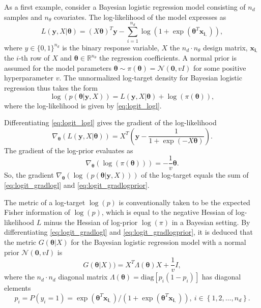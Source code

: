 \documentclass[twoside,11pt]{article}
\begin{document}
As a first example, consider a Bayesian logistic regression model consisting of $n_d$ samples and $n_{\theta}$ covariates. 
The log-likelihood of the model expresses as
\begin{equation}
\label{eq:logit_logl}
L(\mathbf{y}, X | \boldsymbol{\theta})=
(X\boldsymbol{\theta})^T\mathbf{y}-
\sum_{i=1}^{n_d}\log\left(1+\exp(\boldsymbol{\theta}^T
\mathbf{x_{i,}})\right),
\end{equation}
where $y\in\{0,1\}^{n_d}$ is the binary response variable, $X$ the $n_d\cdot n_{\theta}$ design matrix, $\mathbf{x_{i,}}$ 
the $i$-th row of $X$ and $\boldsymbol{\theta}\in\mathbb{R}^{n_{\theta}}$ the regression coefficients. A normal prior is 
assumed for the model parameters $\boldsymbol{\theta}\sim\pi({\boldsymbol{\theta}})=\mathcal{N}(\boldsymbol{0},vI)$ for some
positive hyperparameter $v$. The unnormalized log-target density for Bayesian logistic regression thus takes the form
\begin{equation}
\label{eq:logit_target}
\log{(p(\boldsymbol{\theta}|\mathbf{y}, X))}=L(\mathbf{y}, X | \boldsymbol{\theta})+\log{(\pi(\boldsymbol{\theta}))},
\end{equation}
where the log-likelihood is given by \eqref{eq:logit_logl}.

Differentiating \eqref{eq:logit_logl} gives the gradient of the log-likelihood
\begin{equation}
\label{eq:logit_gradlogl}
\nabla_{\boldsymbol{\theta}}(L(\mathbf{y},X|\boldsymbol{\theta}))=
X^T\left(\mathbf{y}-
\frac{1}{1+\exp\left(-X\boldsymbol{\theta}\right)}\right).
\end{equation}
The gradient of the log-prior evaluates as
\begin{equation}
\label{eq:logit_gradlogprior}
\nabla_{\boldsymbol{\theta}}(\log{(\pi({\boldsymbol{\theta}}))})=
-\frac{1}{v}\boldsymbol{\theta}.
\end{equation}
So, the gradient
$\nabla_{\boldsymbol{\theta}}(\log{(p(\boldsymbol{\theta}|\mathbf{y}, X))})$ of the log-target equals the sum of
\eqref{eq:logit_gradlogl} and \eqref{eq:logit_gradlogprior}.

The metric of a log-target $\log{(p)}$ is conventionally taken to be the expected Fisher information of $\log{(p)}$, which 
is equal to the  negative Hessian of log-likelihood $L$ minus the Hessian of log-prior $\log{(\pi)}$ in a Bayesian setting. 
By differentiating 
\eqref{eq:logit_gradlogl} and \eqref{eq:logit_gradlogprior}, it is deduced that the metric 
$G(\boldsymbol{\theta}|X)$ for the Bayesian logistic regression model with a normal prior $\mathcal{N}(\boldsymbol{0},vI)$ is
\begin{equation}
\label{eq:blr:G:normalprior}
G(\boldsymbol{\theta}|X))=X^T\Lambda(\boldsymbol{\theta})X+
\frac{1}{v}I,
\end{equation}
where the $n_d\cdot n_d$ diagonal matrix $\Lambda(\boldsymbol{\theta})=\mbox{diag}\left[p_i(1-p_i)\right]$ has diagonal 
elements
\begin{equation}
p_i=P(y_i=1)=\exp(\boldsymbol{\theta}^T\mathbf{x_{i,}})/
(1+\exp(\boldsymbol{\theta}^T\mathbf{x_{i,}})),~i\in\left\{1,2,\dots,n_{d}\right\}.
\end{equation}
\end{document}

